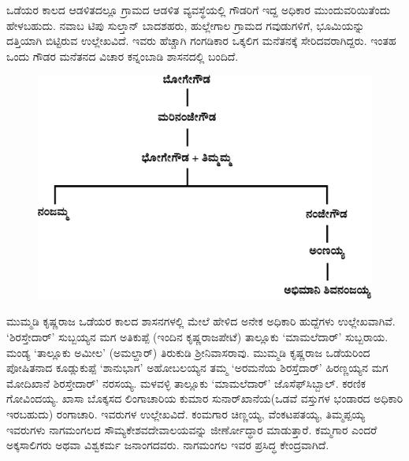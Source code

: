 \newpage

ಒಡೆಯರ ಕಾಲದ ಆಡಳಿತದಲ್ಲೂ ಗ್ರಾಮದ ಆಡಳಿತ ವ್ಯವಸ್ಥೆಯಲ್ಲಿ ಗೌಡರಿಗೆ ಇದ್ದ ಅಧಿಕಾರ ಮುಂದುವರಿಯಿತೆಂದು ಹೇಳಬಹುದು. ನವಾಬ ಟಿಪು ಸುಲ್ತಾನ್​ ಬಾದಶಹರು, ಹುಲ್ಲೇಗಾಲ ಗ್ರಾಮದ ಗವುಡುಗಳಿಗೆ, ಭೂಮಿಯನ್ನು ದತ್ತಿಯಾಗಿ ಬಿಟ್ಟಿರುವ ಉಲ್ಲೇಖವಿದೆ. ಇವರು ಹೆಚ್ಚಾಗಿ ಗಂಗಡಿಕಾರ ಒಕ್ಕಲಿಗ ಮನೆತನಕ್ಕೆ ಸೇರಿದವರಾಗಿದ್ದರು. ಇಂತಹ ಒಂದು ಗೌಡರ ಮನೆತನದ ವಿಚಾರ ಕನ್ನಂಬಾಡಿ ಶಾಸನದಲ್ಲಿ ಬಂದಿದೆ.

\begin{figure}[H]
\includegraphics[scale=1.2]{images/chap3/chap3fig47.jpeg}
\end{figure}

ಮುಮ್ಮಡಿ ಕೃಷ್ಣರಾಜ ಒಡೆಯರ ಕಾಲದ ಶಾಸನಗಳಲ್ಲಿ ಮೇಲೆ ಹೇಳಿದ ಅನೇಕ ಅಧಿಕಾರಿ ಹುದ್ದೆಗಳು ಉಲ್ಲೇಖವಾಗಿವೆ. ‘ಶಿರಸ್ತೇದಾರ್​’ ಸುಬ್ಬಯ್ಯನ ಮಗ ಅತಿಕುಪ್ಪೆ (ಇಂದಿನ ಕೃಷ್ಣರಾಜಪೇಟೆ) ತಾಲ್ಲೂಕು ‘ಮಾಮಲೆದಾರ್​’ ಸುಬ್ಬರಾಯ. ಮಂಡ್ಯ ‘ತಾಲ್ಲೂಕು ಅಮೀಲ’ (ಅಮಲ್ದಾರ್​) ತಿರುಕುಡಿ ಶ‍್ರೀನಿವಾಸರಾವು. ಮುಮ್ಮಡಿ ಕೃಷ್ಣರಾಜ ಒಡೆಯರಿಂದ ಪೋಷಿತನಾದ ಕೂಡ್ಲುಕುಪ್ಪೆ ‘ಶಾನುಭಾಗ’ ಅಹೋಬಲಯ್ಯನ ತಮ್ಮ ‘ಅರಮನೆಯ ಶಿರಸ್ತೆದಾರ್​’ ಹಿರಣ್ಣಯ್ಯನ ಮಗ ಮೋದಿಖಾನೆ ಶಿರಸ್ತೇದಾರ್​’ ನರಸಯ್ಯ. ಮಳವಳ್ಳಿ ತಾಲ್ಲೂಕು ‘ಮಾಮಲೆದಾರ್​’ ಜೊಸೆಫ್​ ಸಿಬ್ಬಾಲ್​. ಕರಣಿಕ ಗೋವಿಂದಯ್ಯ. ಖಾಸಾ ಬೊಕ್ಕಸದ ಲಿಂಗಾಚಾರಿಯ ಕುಮಾರ ಸುನಾರ್​ಖಾನೆಯ(ಒಡವೆ ವಸ್ತುಗಳ ಭಂಡಾರದ ಅಧಿಕಾರಿ ಇರಬಹುದು) ರಂಗಾಚಾರಿ. ಇವರುಗಳ ಉಲ್ಲೇಖವಿದೆ. ಕಂಮಗಾರ ಚಿಣ್ಣಯ್ಯ, ವೆಂಕಟಪತಯ್ಯ, ತಿಮ್ಮಪ್ಪಯ್ಯ ಇವರುಗಳು ನಾಗಮಂಗಲದ ಸೌಮ್ಯಕೇಶವದೇವಾಲಯವನ್ನು ಜೀರ್ಣೋದ್ಧಾರ ಮಾಡುತ್ತಾರೆ. ಕಮ್ಮಗಾರ ಎಂದರೆ ಅಕ್ಕಸಾಲಿಗರು ಅಥವಾ ವಿಶ್ವಕರ್ಮ ಜನಾಂಗದವರು. ನಾಗಮಂಗಲ ಇವರ ಪ್ರಸಿದ್ಧ ಕೇಂದ್ರವಾಗಿದೆ.


